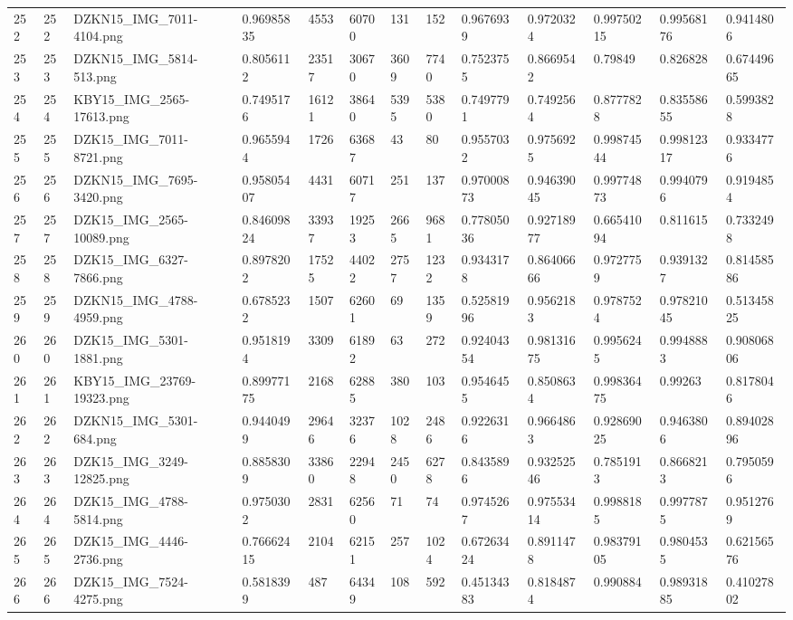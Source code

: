 \documentclass[11pt, a4paper, twoside]{report}
\begin{document}
\begin{longtable}[c]{@{}lllllllllllll@{}}
252 & 252 & DZKN15\_IMG\_7011-4104.png & 0.96985835 & 4553 & 60700 & 131 & 152 & 0.9676939 & 0.9720324 & 0.99750215 & 0.99568176 & 0.9414806 \\
253 & 253 & DZKN15\_IMG\_5814-513.png & 0.8056112 & 23517 & 30670 & 3609 & 7740 & 0.7523755 & 0.8669542 & 0.79849 & 0.826828 & 0.67449665 \\
254 & 254 & KBY15\_IMG\_2565-17613.png & 0.7495176 & 16121 & 38640 & 5395 & 5380 & 0.7497791 & 0.7492564 & 0.8777828 & 0.83558655 & 0.5993828 \\
255 & 255 & DZK15\_IMG\_7011-8721.png & 0.9655944 & 1726 & 63687 & 43 & 80 & 0.9557032 & 0.9756925 & 0.99874544 & 0.99812317 & 0.9334776 \\
256 & 256 & DZKN15\_IMG\_7695-3420.png & 0.95805407 & 4431 & 60717 & 251 & 137 & 0.97000873 & 0.94639045 & 0.99774873 & 0.9940796 & 0.9194854 \\
257 & 257 & DZK15\_IMG\_2565-10089.png & 0.84609824 & 33937 & 19253 & 2665 & 9681 & 0.77805036 & 0.92718977 & 0.66541094 & 0.811615 & 0.7332498 \\
258 & 258 & DZK15\_IMG\_6327-7866.png & 0.8978202 & 17525 & 44022 & 2757 & 1232 & 0.9343178 & 0.86406666 & 0.9727759 & 0.9391327 & 0.81458586 \\
259 & 259 & DZKN15\_IMG\_4788-4959.png & 0.6785232 & 1507 & 62601 & 69 & 1359 & 0.52581996 & 0.9562183 & 0.9787524 & 0.97821045 & 0.51345825 \\
260 & 260 & DZK15\_IMG\_5301-1881.png & 0.9518194 & 3309 & 61892 & 63 & 272 & 0.92404354 & 0.98131675 & 0.9956245 & 0.9948883 & 0.90806806 \\
261 & 261 & KBY15\_IMG\_23769-19323.png & 0.89977175 & 2168 & 62885 & 380 & 103 & 0.9546455 & 0.8508634 & 0.99836475 & 0.99263 & 0.8178046 \\
262 & 262 & DZKN15\_IMG\_5301-684.png & 0.9440499 & 29646 & 32376 & 1028 & 2486 & 0.9226316 & 0.9664863 & 0.92869025 & 0.9463806 & 0.89402896 \\
263 & 263 & DZK15\_IMG\_3249-12825.png & 0.8858309 & 33860 & 22948 & 2450 & 6278 & 0.8435896 & 0.93252546 & 0.7851913 & 0.8668213 & 0.7950596 \\
264 & 264 & DZK15\_IMG\_4788-5814.png & 0.9750302 & 2831 & 62560 & 71 & 74 & 0.9745267 & 0.97553414 & 0.9988185 & 0.9977875 & 0.9512769 \\
265 & 265 & DZK15\_IMG\_4446-2736.png & 0.76662415 & 2104 & 62151 & 257 & 1024 & 0.67263424 & 0.8911478 & 0.98379105 & 0.9804535 & 0.62156576 \\
266 & 266 & DZK15\_IMG\_7524-4275.png & 0.5818399 & 487 & 64349 & 108 & 592 & 0.45134383 & 0.8184874 & 0.990884 & 0.98931885 & 0.41027802 \\

\end{longtable}
\end{document}
